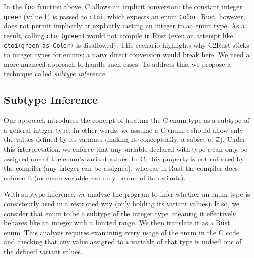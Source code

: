 \documentclass[10pt,conference]{IEEEtran}
\begin{document}
In the \texttt{foo} function above, C allows an implicit conversion: the constant integer \texttt{green} (value 1) is passed to \texttt{ctoi}, which expects an enum \texttt{Color}. Rust, however, does not permit implicitly or explicitly casting an integer to an enum type. As a result, calling \texttt{ctoi(green)} would not compile in Rust (even an attempt like \texttt{ctoi(green as Color)} is disallowed). This scenario highlights why C2Rust sticks to integer types for enums; a na\"ive direct conversion would break here. We need a more nuanced approach to handle such cases. To address this, we propose a technique called \emph{subtype inference}.

\subsection{Subtype Inference}

Our approach introduces the concept of treating the C enum type as a subtype of a general integer type. In other words, we assume a C enum $\epsilon$ should allow only the values defined by its variants (making it, conceptually, a subset of $\mathbb{Z}$). Under this interpretation, we enforce that any variable declared with type $\epsilon$ can only be assigned one of the enum's variant values. In C, this property is not enforced by the compiler (any integer can be assigned), whereas in Rust the compiler does enforce it (an enum variable can only be one of its variants).

With subtype inference, we analyze the program to infer whether an enum type is consistently used in a restricted way (only holding its variant values). If so, we consider that enum to be a subtype of the integer type, meaning it effectively behaves like an integer with a limited range. We then translate it as a Rust enum. This analysis requires examining every usage of the enum in the C code and checking that any value assigned to a variable of that type is indeed one of the defined variant values.
\end{document}
